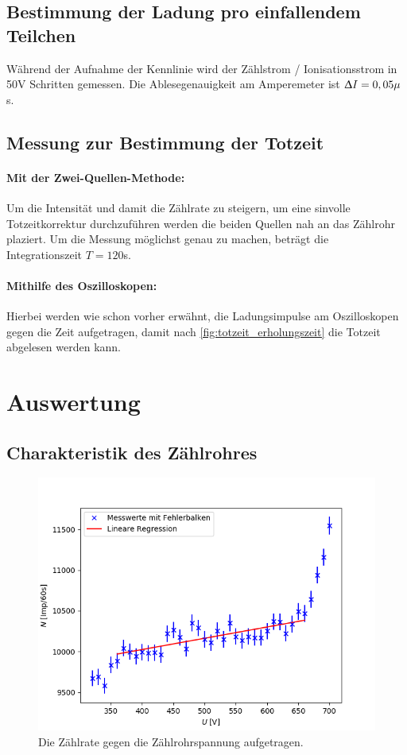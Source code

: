 \documentclass[titlepage = firstcover]{scrartcl}
\begin{document}
      \subsection{Bestimmung der Ladung pro einfallendem Teilchen}
        Während der Aufnahme der Kennlinie wird der Zählstrom / Ionisationsstrom in 50V Schritten gemessen. Die Ablesegenauigkeit am Amperemeter ist $\Updelta I = 0,05 \mu$s.

      \subsection{Messung zur Bestimmung der Totzeit}
        \paragraph{Mit der Zwei-Quellen-Methode:}
          Um die Intensität und damit die Zählrate zu steigern, um eine sinvolle Totzeitkorrektur durchzuführen werden die beiden Quellen nah an das Zählrohr plaziert. Um die Messung möglichst genau zu machen, beträgt die Integrationszeit $T = 120$s.
        \paragraph{Mithilfe des Oszilloskopen:}
          Hierbei werden wie schon vorher erwähnt, die Ladungsimpulse am Oszilloskopen gegen die Zeit aufgetragen, damit nach \autoref{fig:totzeit_erholungszeit} die Totzeit abgelesen werden kann.

    
    \newpage
    \section{Auswertung}
      \subsection{Charakteristik des Zählrohres}
      \begin{figure}[h]
        \centering
        \includegraphics[width = 0.8\linewidth]{Plateau.png}
        \caption{Die Zählrate gegen die Zählrohrspannung aufgetragen.}
        \label{fig:totzeit_erholungszeit}
      \end{figure}
      \FloatBarrier
      
\end{document}
